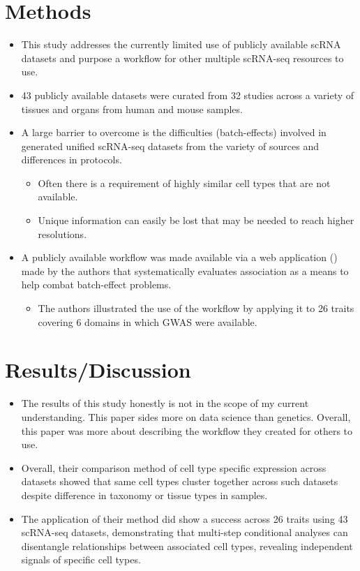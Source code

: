 \documentclass[plain,basic]{inVerba-notes}
\begin{document}
\section{Methods}
\begin{itemize}
    \item This study addresses the currently limited use of publicly available scRNA datasets and purpose a workflow for other multiple scRNA-seq resources to use.
    \item 43 publicly available datasets were curated from 32 studies across a variety of tissues and organs from human and mouse samples.
    \item A large barrier to overcome is the difficulties (batch-effects) involved in generated unified scRNA-seq datasets from the variety of sources and differences in protocols.
        \begin{itemize}
            \item Often there is a requirement of highly similar cell types that are not available.
            \item Unique information can easily be lost that may be needed to reach higher resolutions.
        \end{itemize}
    \item A publicly available workflow was made available via a web application (\href{http://fuma.ctglab.nl}{}) made by the authors that systematically evaluates association as a means to help combat batch-effect problems.
        \begin{itemize}
            \item The authors illustrated the use of the workflow by applying it to 26 traits covering 6 domains in which GWAS were available.
        \end{itemize}
\end{itemize}

\section{Results/Discussion}
\begin{itemize}
    \item The results of this study honestly is not in the scope of my current understanding. This paper sides more on data science than genetics. Overall, this paper was more about describing the workflow they created for others to use. 
    \item Overall, their comparison method of cell type specific expression across datasets showed that same cell types cluster together across such datasets despite difference in taxonomy or tissue types in samples. 
    \item The application of their method did show a success across 26 traits using 43 scRNA-seq datasets, demonstrating that multi-step conditional analyses can disentangle relationships between associated cell types, revealing independent signals of specific cell types.
\end{itemize}

\nocite{adhikari2020role}


\end{document}
